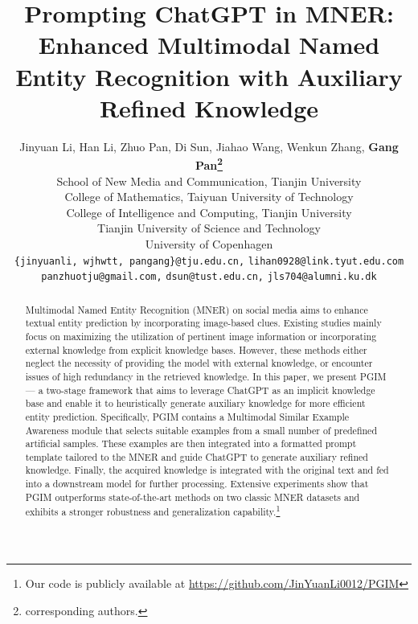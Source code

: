 \documentclass[11pt]{article}
\title{Prompting ChatGPT in MNER: Enhanced Multimodal Named Entity Recognition with Auxiliary Refined Knowledge}
\author{Jinyuan Li, Han Li, Zhuo Pan, Di Sun, Jiahao Wang, Wenkun Zhang, \textbf{Gang Pan\thanks{\hspace{1mm} corresponding authors. }}\\
 School of New Media and Communication, Tianjin University \\
 College of Mathematics, Taiyuan University of Technology \\
 College of Intelligence and Computing, Tianjin University \\
 Tianjin University of Science and Technology\\  
 University of Copenhagen \\
  {\tt \{jinyuanli, wjhwtt, pangang\}@tju.edu.cn,} 
  {\tt lihan0928@link.tyut.edu.com} \\
  {\tt panzhuotju@gmail.com,} 
  {\tt dsun@tust.edu.cn,}
  {\tt jls704@alumni.ku.dk}
}
\begin{document}
\maketitle
\begin{abstract}
Multimodal Named Entity Recognition (MNER) on social media aims to enhance textual entity prediction by incorporating image-based clues. Existing studies mainly focus on maximizing the utilization of pertinent image information or incorporating external knowledge from explicit knowledge bases. However, these methods either neglect the necessity of providing the model with external knowledge, or encounter issues of high redundancy in the retrieved knowledge. In this paper, we present PGIM --- a two-stage framework that aims to leverage ChatGPT as an implicit knowledge base and enable it to heuristically generate auxiliary knowledge for more efficient entity prediction. Specifically, PGIM contains a Multimodal Similar Example Awareness module that selects suitable examples from a small number of predefined artificial samples. These examples are then integrated into a formatted prompt template tailored to the MNER and guide ChatGPT to generate auxiliary refined knowledge. Finally, the acquired knowledge is integrated with the original text and fed into a downstream model for further processing. Extensive experiments show that PGIM outperforms state-of-the-art methods on two classic MNER datasets and exhibits a stronger robustness and generalization capability.\footnote{Our code is publicly available at \url{https://github.com/JinYuanLi0012/PGIM}} 
\end{abstract}
\end{document}
